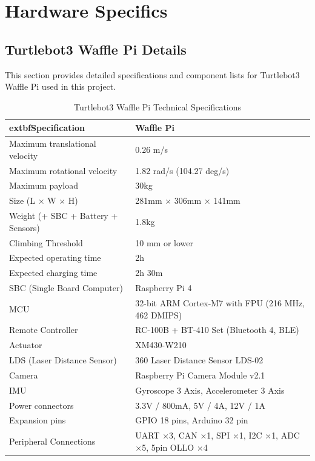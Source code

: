 \chapter{Hardware Specifics\label{chap:hardware_specifics}}
\section{Turtlebot3 Waffle Pi Details}\label{sec:turtlebot3_details}
This section provides detailed specifications and component lists for Turtlebot3 Waffle Pi used in this project.
\begin{table}[htbp]
	\centering
	\caption{Turtlebot3 Waffle Pi Technical Specifications}
	\label{tab:turtlebot3_specs}
	\begin{tabular}{|l|p{8cm}|}
		\hline
			extbf{Specification} & \textbf{Waffle Pi} \\
		\hline
		Maximum translational velocity & 0.26 m/s \\
		\hline
		Maximum rotational velocity & 1.82 rad/s (104.27 deg/s) \\
		\hline
		Maximum payload & 30kg \\
		\hline
		Size (L $\times$ W $\times$ H) & 281mm $\times$ 306mm $\times$ 141mm \\
		\hline
		Weight (+ SBC + Battery + Sensors) & 1.8kg \\
		\hline
		Climbing Threshold & 10 mm or lower \\
		\hline
		Expected operating time & 2h \\
		\hline
		Expected charging time & 2h 30m \\
		\hline
		SBC (Single Board Computer) & Raspberry Pi 4 \\
		\hline
		MCU & 32-bit ARM Cortex\textregistered-M7 with FPU (216 MHz, 462 DMIPS) \\
		\hline
		Remote Controller & RC-100B + BT-410 Set (Bluetooth 4, BLE) \\
		\hline
		Actuator & XM430-W210 \\
		\hline
		LDS (Laser Distance Sensor) & 360 Laser Distance Sensor LDS-02 \\
		\hline
		Camera & Raspberry Pi Camera Module v2.1 \\
		\hline
		IMU & Gyroscope 3 Axis, Accelerometer 3 Axis \\
		\hline
		Power connectors & 3.3V / 800mA, 5V / 4A, 12V / 1A \\
		\hline
		Expansion pins & GPIO 18 pins, Arduino 32 pin \\
		\hline
		Peripheral Connections & UART $\times$3, CAN $\times$1, SPI $\times$1, I2C $\times$1, ADC $\times$5, 5pin OLLO $\times$4 \\

\end{tabular}
\end{table}
